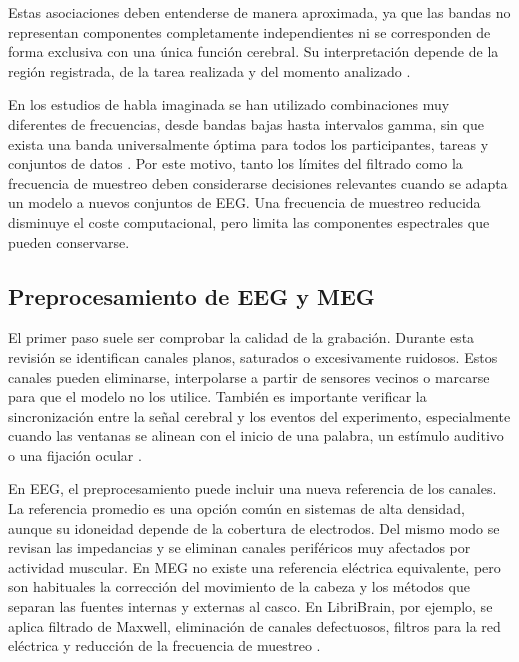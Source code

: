 Estas asociaciones deben entenderse de manera aproximada, ya que las bandas no representan componentes completamente independientes ni se corresponden de forma exclusiva con una única función cerebral. Su interpretación depende de la región registrada, de la tarea realizada y del momento analizado \cite{buzsaki2004neuronal,klimesch1999eeg,engel2010beta}.

En los estudios de habla imaginada se han utilizado combinaciones muy diferentes de frecuencias, desde bandas bajas hasta intervalos gamma, sin que exista una banda universalmente óptima para todos los participantes, tareas y conjuntos de datos \cite{panachakel2021covert,alzahrani2024systematic}. Por este motivo, tanto los límites del filtrado como la frecuencia de muestreo deben considerarse decisiones relevantes cuando se adapta un modelo a nuevos conjuntos de EEG. Una frecuencia de muestreo reducida disminuye el coste computacional, pero limita las componentes espectrales que pueden conservarse.

\subsection{Preprocesamiento de EEG y MEG}

El primer paso suele ser comprobar la calidad de la grabación. Durante esta revisión se identifican canales planos, saturados o excesivamente ruidosos. Estos canales pueden eliminarse, interpolarse a partir de sensores vecinos o marcarse para que el modelo no los utilice. También es importante verificar la sincronización entre la señal cerebral y los eventos del experimento, especialmente cuando las ventanas se alinean con el inicio de una palabra, un estímulo auditivo o una fijación ocular \cite{gramfort2013mne}.

En EEG, el preprocesamiento puede incluir una nueva referencia de los canales. La referencia promedio es una opción común en sistemas de alta densidad, aunque su idoneidad depende de la cobertura de electrodos. Del mismo modo se revisan las impedancias y se eliminan canales periféricos muy afectados por actividad muscular. En MEG no existe una referencia eléctrica equivalente, pero son habituales la corrección del movimiento de la cabeza y los métodos que separan las fuentes internas y externas al casco. En LibriBrain, por ejemplo, se aplica filtrado de Maxwell, eliminación de canales defectuosos, filtros para la red eléctrica y reducción de la frecuencia de muestreo \cite{gramfort2013mne,ozdogan2025libribrain}.

